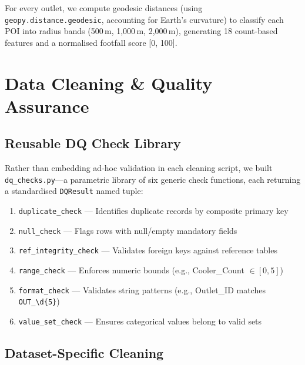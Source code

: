 \documentclass[10.75pt, a4paper]{article}
\begin{document}
For every outlet, we compute geodesic distances (using \texttt{geopy.distance.geodesic}, accounting for Earth's curvature) to classify each POI into radius bands (500\,m, 1,000\,m, 2,000\,m), generating 18 count-based features and a normalised footfall score [0, 100].

\section{Data Cleaning \& Quality Assurance}

\subsection{Reusable DQ Check Library}

Rather than embedding ad-hoc validation in each cleaning script, we built \texttt{dq\_checks.py}---a parametric library of six generic check functions, each returning a standardised \texttt{DQResult} named tuple:

\begin{enumerate}
    \item \texttt{duplicate\_check} --- Identifies duplicate records by composite primary key
    \item \texttt{null\_check} --- Flags rows with null/empty mandatory fields
    \item \texttt{ref\_integrity\_check} --- Validates foreign keys against reference tables
    \item \texttt{range\_check} --- Enforces numeric bounds (e.g., Cooler\_Count $\in [0, 5]$)
    \item \texttt{format\_check} --- Validates string patterns (e.g., Outlet\_ID matches \texttt{OUT\_\textbackslash d\{5\}})
    \item \texttt{value\_set\_check} --- Ensures categorical values belong to valid sets
\end{enumerate}

\subsection{Dataset-Specific Cleaning}
\end{document}
